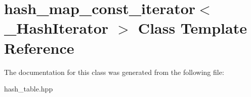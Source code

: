 \section{hash\+\_\+map\+\_\+const\+\_\+iterator$<$ \+\_\+\+Hash\+Iterator $>$ Class Template Reference}
\label{classhash__map__const__iterator}


The documentation for this class was generated from the following file\+:\begin{DoxyCompactItemize}
\item 
hash\+\_\+table.\+hpp\end{DoxyCompactItemize}
